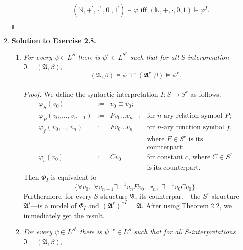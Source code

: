 \begin{enumerate}[1.]
\begin{enumerate}[(a)]
\[
\mbox{$\;\;\;$ $(\mathbb{N}, +^\prime, \cdot^\prime, 0^\prime, 1^\prime) \models \varphi$ \  iff \  $(\mathbb{N}, +, \cdot, 0, 1) \models \varphi^I$}.
\]
\end{enumerate} \begin{flushright}$\talloblong$\end{flushright}
%
\item \textbf{Solution to Exercise 2.8.}
\begin{enumerate}
\item \textit{For every $\psi \in L^S$ there is $\psi^r \in L^{S^r}$ such that for all $S$-interpretation $\mathfrak{I} = (\mathfrak{A}, \beta)$,
\[
\mbox{$(\mathfrak{A}, \beta) \models \psi$ iff $(\mathfrak{A}^r, \beta) \models \psi^r$}.
\]}
\\
\textit{Proof.} We define the syntactic interpretation $I : S \rightarrow S^r$ as follows:
\[
\begin{array}{llll}
\varphi_S(v_0) & := & v_0 \equiv v_0; & \  \\
\varphi_P(v_0, \ldots, v_{n-1}) & := & Pv_0 \ldots v_{n-1} & \mbox{for $n$-ary relation symbol $P$}; \\
\varphi_f(v_0, \ldots, v_n) & := & Fv_0 \ldots v_n & \mbox{for $n$-ary function symbol $f$,} \\
\                           & \  & \               & \mbox{where $F \in S^r$ is its} \\
\                           & \  & \               & \mbox{counterpart}; \\
\varphi_c(v_0) & := & Cv_0 & \mbox{for constant $c$, where $C \in S^r$} \\
\                           & \  & \               & \mbox{is its counterpart}.
\end{array}
\]
Then $\Phi_I$ is equivalent to
\[
\{ \forall v_0 \ldots \forall v_{n-1} \exists^{=1} v_n Fv_0 \ldots v_n,\; \exists^{=1}v_0Cv_0\}.
\]
Furthermore, for every $S$-structure $\mathfrak{A}$, its counterpart---the $S^r$-structure $\mathfrak{A}^r$---is a model of $\Phi_I$ and $(\mathfrak{A}^r)^{-I} = \mathfrak{A}$. After using Theorem 2.2, we immediately get the result.
\item \textit{For every $\psi \in L^{S^r}$ there is $\psi^{-r} \in L^S$ such that for all $S$-interpretations $\mathfrak{I} = (\mathfrak{A}, \beta)$,
}
\end{enumerate}
\end{enumerate}
